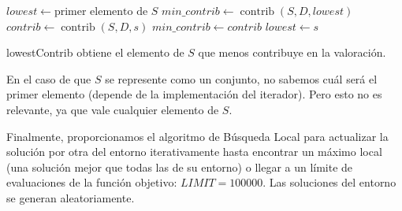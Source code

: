 \documentclass{article}
\begin{document}
\begin{algorithm}[H]
	\DontPrintSemicolon %
	$lowest \gets \text{primer elemento de } S$\;
	$min\_contrib \gets \operatorname{contrib}(S,D,lowest)$\;
	 {
		$contrib \gets \operatorname{contrib}(S,D,s)$\;
		 { 
			$min\_contrib \gets contrib$\;
			$lowest \gets s$ 
		}
	}
	\;
	\;
	\caption{{\sc lowestContrib} obtiene el elemento de $S$ que menos contribuye en la valoración.}
	\label{alg:lowest-contributor}
\end{algorithm}

En el caso de que $S$ se represente como un conjunto, no sabemos cuál será el primer elemento (depende de la implementación del iterador). Pero
esto no es relevante, ya que vale cualquier elemento de $S$.

Finalmente, proporcionamos el algoritmo de Búsqueda Local para actualizar la solución por otra del entorno iterativamente
hasta encontrar un máximo local (una solución mejor que todas las de su entorno) o llegar a un límite de evaluaciones de la función
objetivo: $LIMIT=100000$. Las soluciones del entorno se generan aleatoriamente.
\end{document}
